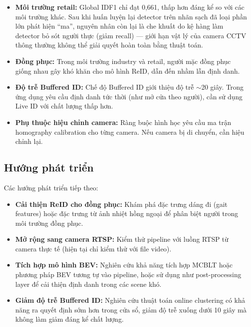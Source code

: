 \documentclass{article} %
\begin{document}
\begin{itemize}
    \item \textbf{Môi trường retail:} Global IDF1 chỉ đạt 0,661, thấp hơn đáng kể so với các môi trường khác. Sau khi huấn luyện lại detector trên nhãn sạch đã loại phần lớn phát hiện ``ma'', nguyên nhân còn lại là che khuất do kệ hàng làm detector bỏ sót người thực (giảm recall) --- giới hạn vật lý của camera CCTV thông thường không thể giải quyết hoàn toàn bằng thuật toán.

    \item \textbf{Đồng phục:} Trong môi trường industry và retail, người mặc đồng phục giống nhau gây khó khăn cho mô hình ReID, dẫn đến nhầm lẫn định danh.

    \item \textbf{Độ trễ Buffered ID:} Chế độ Buffered ID giới thiệu độ trễ $\sim$20 giây. Trong ứng dụng yêu cầu định danh tức thời (như mở cửa theo người), cần sử dụng Live ID với chất lượng thấp hơn.

    \item \textbf{Phụ thuộc hiệu chỉnh camera:} Ràng buộc hình học yêu cầu ma trận homography calibration cho từng camera. Nếu camera bị di chuyển, cần hiệu chỉnh lại.
\end{itemize}

\subsection*{Hướng phát triển}

Các hướng phát triển tiếp theo:

\begin{itemize}
    \item \textbf{Cải thiện ReID cho đồng phục:} Khám phá đặc trưng dáng đi (gait features) hoặc đặc trưng từ ảnh nhiệt hồng ngoại để phân biệt người trong môi trường đồng phục.

    \item \textbf{Mở rộng sang camera RTSP:} Kiểm thử pipeline với luồng RTSP từ camera thực tế (hiện tại chỉ kiểm thử với file video).

    \item \textbf{Tích hợp mô hình BEV:} Nghiên cứu khả năng tích hợp MCBLT \cite{Wang24MCBLT} hoặc phương pháp BEV tương tự vào pipeline, hoặc sử dụng như post-processing layer để cải thiện định danh trong các scene khó.

    \item \textbf{Giảm độ trễ Buffered ID:} Nghiên cứu thuật toán online clustering có khả năng ra quyết định sớm hơn trong cửa sổ, giảm độ trễ xuống dưới 10 giây mà không làm giảm đáng kể chất lượng.

\end{itemize}

\newpage
{}


\newpage
\end{document}
